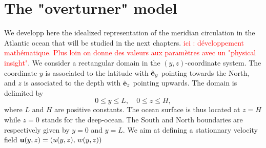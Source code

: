 \chapter{The "overturner" model}
We developp here the idealized representation of the meridian circulation in the Atlantic ocean that will be studied in the next chapters. \textcolor{red}{ici : développement mathématique. Plus loin on donne des valeurs aux paramètres avec un "physical insight"}. We consider a rectangular domain in the $(y,z)$-coordinate system. The coordinate $y$ is associated to the latitude with $\hat{\mathbf{e}}_y$ pointing towards the North, and $z$ is associated to the depth with $\hat{\mathbf{e}}_z$ pointing upwards. The domain is delimited by
\begin{equation}
	0 \le y \le L,\quad 0 \le z \le H,
\end{equation}
where $L$ and $H$ are positive constants. The ocean surface is thus located at $z = H$ while $z = 0$ stands for the deep-ocean. The South and North boundaries are respectively given by $y = 0$ and $y = L$. We aim at defining a stationnary velocity field $\mathbf u(y,z) = (u(y,z),\, w(y,z))$
